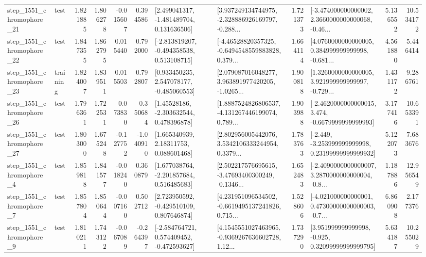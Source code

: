 \begin{tabular}{llrrrrllrlrr}
 step\_1551\_chromophore\_21 &      test &      1.821885 &    1.806278 &     -0.015607 &  0.394586 &    [2.499041317, -1.481489704, 0.131636506] &  [3.937249134744975, -2.328886926169797, -0.288... &       1.721373 &  [-3.474000000000002, 2.3660000000000068, -0.46... &            5.136552 &         10.534172 \\
 step\_1551\_chromophore\_22 &      test &      1.847355 &    1.862795 &      0.015440 &  0.792000 &   [-2.813819207, -0.494358538, 0.513108715] &  [-4.46528820357325, -0.6494548559883828, 0.379... &       1.664114 &  [4.0760000000000005, 0.384999999999998, -0.681... &            4.561880 &          5.446414 \\
 step\_1551\_chromophore\_23 &  training &      1.824007 &    1.839511 &      0.015503 &  0.792807 &    [0.933450235, 2.547078177, -0.485060553] &  [2.079087016048277, 3.963891977420205, -1.0265... &       1.900818 &  [1.3260000000000005, 3.921999999999997, -0.729... &            1.431172 &          9.286761 \\
 step\_1551\_chromophore\_26 &      test &      1.796361 &    1.722531 &     -0.073830 & -0.350684 &     [1.45528186, -2.303632544, 0.478396878] &  [1.8887524826806537, -4.131267446199074, 0.789... &       1.903988 &  [-2.4620000000000015, 3.474, -0.6679999999999993] &            3.177416 &         10.653391 \\
 step\_1551\_chromophore\_27 &      test &      1.803000 &    1.675248 &     -0.127752 & -1.040910 &      [1.665340939, 2.18311753, 0.088601468] &  [2.802956005442076, 3.5342106333244954, 0.3379... &       1.783763 &  [-2.449, -3.253999999999998, 0.23199999999999932] &            5.122073 &          7.683676 \\
  step\_1551\_chromophore\_4 &      test &      1.859818 &    1.841577 &     -0.018240 &  0.360879 &    [1.677038764, -2.201857684, 0.516485683] &  [2.502217576695615, -3.47693400300249, -0.1346... &       1.652483 &  [-2.4090000000000007, 3.2870000000000004, -0.8... &            1.187886 &         12.956549 \\
  step\_1551\_chromophore\_7 &      test &      1.857804 &    1.850644 &     -0.007160 &  0.502712 &    [2.723950592, -0.429510109, 0.807646874] &  [4.231951096534502, -0.6619495137241826, 0.715... &       1.528606 &  [-4.021000000000001, 0.47300000000000003, -0.7... &            6.860908 &          2.177376 \\
  step\_1551\_chromophore\_9 &      test &      1.810211 &    1.743122 &     -0.067089 & -0.264397 &   [-2.584764721, 0.574409452, -0.472593627] &  [4.1545551027463965, -0.9369267636602728, 1.12... &       1.737290 &   [3.951999999999998, -0.925, 0.32099999999999795] &            5.634187 &         10.255029 \\

\end{tabular}
